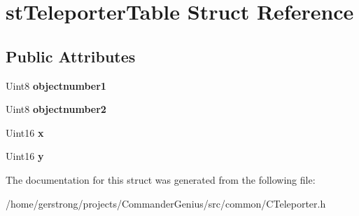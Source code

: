 \hypertarget{structst_teleporter_table}{
\section{stTeleporterTable Struct Reference}
\label{structst_teleporter_table}
}
\subsection*{Public Attributes}
\begin{DoxyCompactItemize}
\item 
\hypertarget{structst_teleporter_table_a7b7c667544a208a7159df34b2d912099}{
Uint8 {\bfseries objectnumber1}}
\label{structst_teleporter_table_a7b7c667544a208a7159df34b2d912099}

\item 
\hypertarget{structst_teleporter_table_ae1414827cf7f36fecb9742f88dbf7810}{
Uint8 {\bfseries objectnumber2}}
\label{structst_teleporter_table_ae1414827cf7f36fecb9742f88dbf7810}

\item 
\hypertarget{structst_teleporter_table_ad75d2300bbc29f2b557a39b18c25e642}{
Uint16 {\bfseries x}}
\label{structst_teleporter_table_ad75d2300bbc29f2b557a39b18c25e642}

\item 
\hypertarget{structst_teleporter_table_a0b7b5adc29447761ba4e55b06e94df17}{
Uint16 {\bfseries y}}
\label{structst_teleporter_table_a0b7b5adc29447761ba4e55b06e94df17}

\end{DoxyCompactItemize}


The documentation for this struct was generated from the following file:\begin{DoxyCompactItemize}
\item 
/home/gerstrong/projects/CommanderGenius/src/common/CTeleporter.h\end{DoxyCompactItemize}
